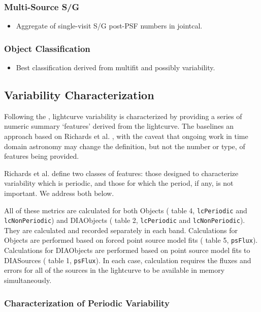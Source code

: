 \subsubsection{Multi-Source S/G}
\label{sec:acJointCalClassification}
\begin{itemize}
\item Aggregate of single-visit S/G post-PSF numbers in jointcal.
\end{itemize}
\subsubsection{Object Classification}
\label{sec:acObjectClassification}
\begin{itemize}
\item Best classification derived from multifit and possibly variability.
\end{itemize}

\subsection{Variability Characterization}
\label{sec:acVariabilityCharacterization}

Following the \DPDD{}, lightcurve variability is characterized by providing a series of numeric summary `features' derived from the lightcurve. The \DPDD baselines an approach based on Richards et al. \cite{2011ApJ...733...10R}, with the caveat that ongoing work in time domain astronomy may change the definition, but not the number or type, of features being provided.

Richards et al. define two classes of features: those designed to characterize variability which is periodic, and those for which the period, if any, is not important. We address both below.

All of these metrics are calculated for both Objects (\DPDD{} table 4, \texttt{lcPeriodic} and \texttt{lcNonPeriodic}) and DIAObjects (\DPDD{} table 2, \texttt{lcPeriodic} and \texttt{lcNonPeriodic}). They are calculated and recorded separately in each band. Calculations for Objects are performed based on forced point source model fits (\DPDD{} table 5, \texttt{psFlux}).  Calculations for DIAObjects are performed based on point source model fits to DIASources (\DPDD{} table 1, \texttt{psFlux}). In each case, calculation requires the fluxes and errors for all of the sources in the lightcurve to be available in memory simultaneously.

\subsubsection{Characterization of Periodic Variability}

